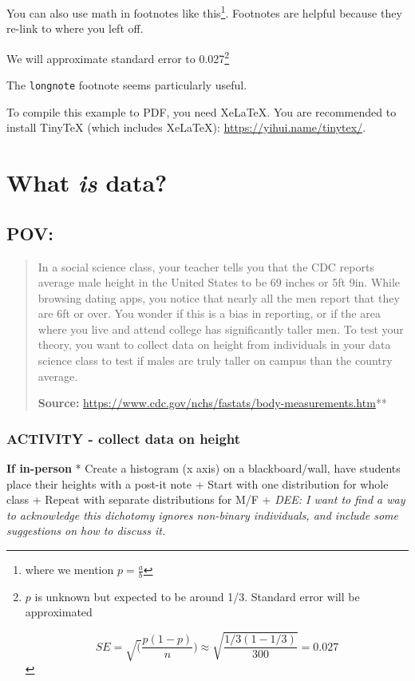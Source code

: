 \documentclass[
]{book}
\begin{document}
You can also use math in footnotes like this\footnote{where we mention \(p = \frac{a}{b}\)}. Footnotes are helpful because they re-link to where you left off.

We will approximate standard error to 0.027\footnote{\(p\) is unknown but expected to be around 1/3. Standard error will be approximated

  \[
  SE = \sqrt(\frac{p(1-p)}{n}) \approx \sqrt{\frac{1/3 (1 - 1/3)} {300}} = 0.027
  \]}

The \texttt{longnote} footnote seems particularly useful.

To compile this example to PDF, you need XeLaTeX. You are recommended to install TinyTeX (which includes XeLaTeX): \url{https://yihui.name/tinytex/}.

\hypertarget{what-is-data-1}{%
\chapter{\texorpdfstring{What \emph{is} data?}{What is data?}}\label{what-is-data-1}}

\hypertarget{pov}{%
\section{POV:}\label{pov}}

\begin{quote}
In a social science class, your teacher tells you that the CDC
reports average male height in the United States to be 69
inches or 5ft 9in. While browsing dating apps, you notice that
nearly all the men report that they are 6ft or over. You wonder
if this is a bias in reporting, or if the area where you live
and attend college has significantly taller men. To test your
theory, you want to collect data on height from individuals in
your data science class to test if males are truly taller on campus
than the country average.

\textbf{Source:} \url{https://www.cdc.gov/nchs/fastats/body-measurements.htm}**
\end{quote}

\hypertarget{activity---collect-data-on-height}{%
\subsection{ACTIVITY - collect data on height}\label{activity---collect-data-on-height}}

\textbf{If in-person}
* Create a histogram (x axis) on a blackboard/wall, have students place their heights
with a post-it note
+ Start with one distribution for whole class
+ Repeat with separate distributions for M/F
+ \emph{DEE: I want to find a way to acknowledge this dichotomy ignores non-binary individuals, and include some suggestions on how to discuss it.}
\end{document}
